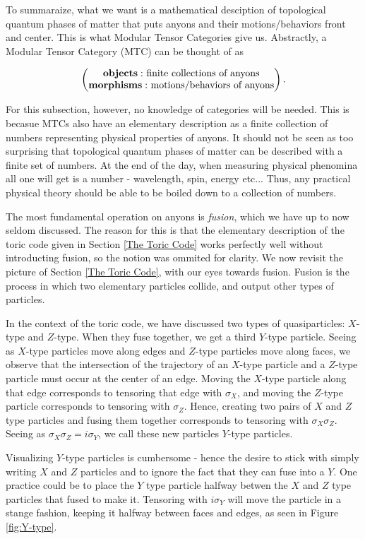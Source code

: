 \documentclass{article}
\theoremstyle{definition}
\numberwithin{figure}{section}
\begin{document}
\begin{enumerate}[\thesection .1.]
To summaraize, what we want is a mathematical desciption of topological quantum phases of matter that puts anyons and their motions/behaviors front and center. This is what Modular Tensor Categories give us. Abstractly, a Modular Tensor Category (MTC) can be thought of as

$$
\begin{pmatrix}
\bold{objects:}\text{ finite collections of anyons} \\
\bold{morphisms:}\text{ motions/behaviors of anyons}
\end{pmatrix}.
$$

For this subsection, however, no knowledge of categories will be needed. This is becasue MTCs also have an elementary description as a finite collection of numbers representing physical properties of anyons. It should not be seen as too surprising that topological quantum phases of matter can be described with a finite set of numbers. At the end of the day, when measuring physical phenomina all one will get is a number - wavelength, spin, energy etc... Thus, any practical physical theory should be able to be boiled down to a collection of numbers.

The most fundamental operation on anyons is \textit{fusion}, which we have up to now seldom discussed. The reason for this is that the elementary description of the toric code given in Section \ref{The Toric Code} works perfectly well without introducting fusion, so the notion was ommited for clarity. We now revisit the picture of Section \ref{The Toric Code}, with our eyes towards fusion. Fusion is the process in which two elementary particles collide, and output other types of particles. 

In the context of the toric code, we have discussed two types of quasiparticles: $X$-type and $Z$-type. When they fuse together, we get a third $Y$-type particle. Seeing as $X$-type particles move along edges and $Z$-type particles move along faces, we observe that the intersection of the trajectory of an $X$-type particle and a $Z$-type particle must occur at the center of an edge. Moving the $X$-type particle along that edge corresponds to tensoring that edge with $\sigma_{X}$, and moving the $Z$-type particle corresponds to tensoring with $\sigma_{Z}$. Hence, creating two pairs of $X$ and $Z$ type particles and fusing them together corresponds to tensoring with $\sigma_X\sigma_Z$. Seeing as $\sigma_X\sigma_Z=i\sigma_Y$, we call these new particles $Y$-type particles.

Visualizing $Y$-type particles is cumbersome - hence the desire to stick with simply writing $X$ and $Z$ particles and to ignore the fact that they can fuse into a $Y$. One practice could be to place the $Y$ type particle halfway betwen the $X$ and $Z$ type particles that fused to make it. Tensoring with $i\sigma_Y$ will move the particle in a stange fashion, keeping it halfway between faces and edges, as seen in Figure \ref{fig:Y-type}.


\end{enumerate}
\end{document}
